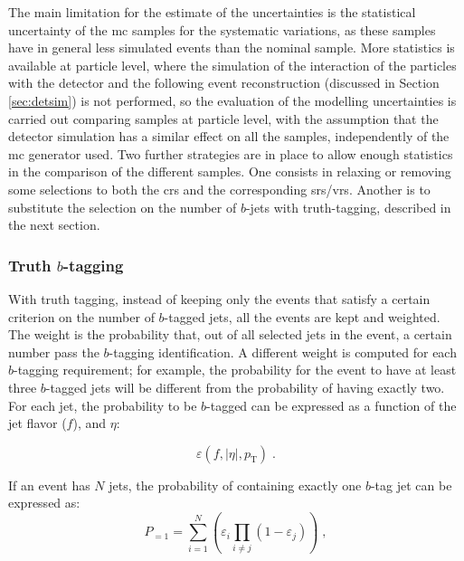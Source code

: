 The main limitation for the estimate of the uncertainties is the statistical uncertainty of the \gls{mc} samples for the systematic variations, as these samples have in general less simulated events than the nominal sample. 
More statistics is available at particle level, where the simulation of the interaction of the particles with the detector and the following event reconstruction (discussed in Section \ref{sec:detsim}) is not performed, so the evaluation of the \ttbar modelling uncertainties is carried out 
comparing samples at particle level, with the assumption that the detector simulation has a similar effect on all the samples, 
independently of the \gls{mc} generator used. Two further strategies are in place to allow enough statistics in the comparison of the different samples. 
One consists in relaxing or removing some selections to both the \glspl{cr} and the corresponding \glspl{sr}/\glspl{vr}. 
Another is to substitute the selection on the number of $b$-jets with truth-tagging, described in the next section.

\subsubsection*{Truth $b$-tagging}

With truth tagging, instead of keeping only the events that satisfy a certain criterion on the number of $b$-tagged jets, all the events are kept and weighted. The weight is the probability that, out of all selected jets in the event,
a certain number pass the $b$-tagging identification.
A different weight is computed for each $b$-tagging requirement; 
for example, the probability for the event to have at least three $b$-tagged jets will be different from the probability of having exactly two. 
For each jet, the probability to be $b$-tagged can be expressed as a function of the jet flavor ($f$), \pt and $\eta$:

\begin{equation}
\varepsilon \left(f,|\eta|,p_{\mathrm{T}}\right) \; .
\label{eq:susy_common:btageff}
\end{equation}

\noindent If an event has $N$ jets, the probability of containing exactly one $b$-tag jet can be expressed as:
\begin{equation}
        P_{=1} = \sum\limits_{i=1}^N \left( \varepsilon_{i} \prod\limits_{i \neq j} \left( 1 - \varepsilon_{j} \right) \right) \; ,
\end{equation}

